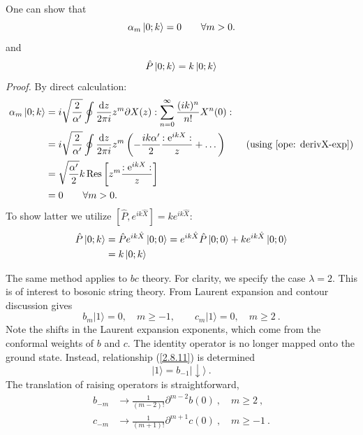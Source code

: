 \begin{tcolorbox}[breakable]
	One can show that
	\begin{equation*}
		\alpha_{m} \ket{0;k } = 0 \qquad \forall m > 0.
	\end{equation*}
	and
	\begin{align*}
		\hat{P}\ket{0;k}=k\ket{0;k}
	\end{align*}
	\noindent \textit{Proof.} By direct calculation:
	\begin{align*}
		\alpha_{m} \ket{0;k} &= \mi \sqrt{\frac{2}{\alpha^{\prime}}} \oint \frac{\dif z}{2 \pi \mi} z^{m} \partial X(z) \typecolon \sum_{n=0}^{\infty} \frac{(\mi k)^{n}}{n!} X^{n}(0) \typecolon \\
		&= \mi \sqrt{\frac{2}{\alpha^{\prime}}} \oint \frac{\dif z}{2 \pi \mi} z^{m} \left( - \frac{\mi k \alpha^{\prime}}{2} \frac{\typecolon \me^{\mi k X} \typecolon}{z} + \dots \right) \tag{using \eqref{ope: derivX-exp}}\\
		&= \sqrt{\frac{\alpha^{\prime}}{2}} k \operatorname{Res} \left[ z^{m} \frac{\typecolon \me^{\mi k X} \typecolon}{z} \right] \\
		&= 0 \qquad \forall m > 0.
	\end{align*}
	To show latter we utilize $[\hat{P},e^{ik\hat{X}}]=ke^{ik\hat{X}}$:
	\begin{align*}
		\hat{P}\ket{0;k} &=\hat{P}e^{ik\hat{X}}\ket{0;0}=e^{ik\hat{X}}\hat{P}\ket{0;0}+ke^{ik\hat{X}}\ket{0;0}\\
		&=k\ket{0;k}
	\end{align*}
\end{tcolorbox}
The same method applies to $bc$ theory. For clarity, we specify the case $\lambda=2$. This is of interest to bosonic string theory.    
From Laurent expansion and contour discussion gives    
\begin{equation}\label{2.8.10}
	b_{m}|1\rangle=0, \quad m \geq-1, \qquad c_{m}|1\rangle=0, \quad m \geq 2 \:.
\end{equation}
Note the shifts in the Laurent expansion exponents, which come from the conformal weights of $b$ and $c$. The identity operator is no longer mapped onto the ground state.    
Instead, relationship (\ref{2.8.11}) is determined    
\begin{equation}
	\lvert 1\rangle=b_{-1}\lvert \downarrow\rangle \:. \label{2.8.11}
\end{equation}
The translation of raising operators is straightforward,    
\begin{subequations} \label{2.8.12}
	\begin{align}
		b_{-m} &\rightarrow \frac{1}{(m-2) !} \partial^{m-2} b(0)\:, \quad m \geq 2 \:, \label{2.8.12a}  \\
		c_{-m} &\rightarrow \frac{1}{(m+1) !} \partial^{m+1} c(0)\:, \quad m \geq-1 \:.
		\label{2.8.12b}
	\end{align}
\end{subequations}
